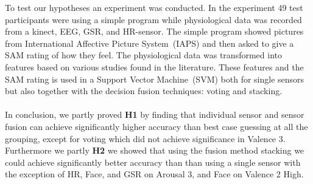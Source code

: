 To test our hypotheses an experiment was conducted. In the experiment 49 test participants were using a simple program while physiological data was recorded from a kinect, EEG, GSR, and HR-sensor. The simple program showed pictures from International Affective Picture System~(IAPS)\cite{iaps} and then asked to give a SAM rating of how they feel.
The physiological data was transformed into features based on various studies found in the literature. 
These features and the SAM rating is used in a Support Vector Machine~(SVM) both for single sensors but also together with the decision fusion techniques: voting and stacking.\\\\
In conclusion, we partly proved \textbf{H1} by finding that individual sensor and sensor fusion can achieve significantly higher accuracy than best case guessing at all the grouping, except for voting which did not achieve significance in Valence 3.
Furthermore we partly \textbf{H2} we showed that using the fusion method stacking we could achieve significantly better accuracy than than using a single sensor with the exception of HR, Face, and GSR on Arousal 3, and Face on Valence 2 High.

